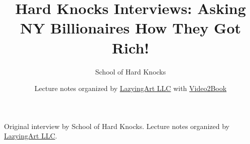 \documentclass[11pt,oneside]{book}
\begin{document}
\frontmatter
\title{Hard Knocks Interviews: Asking NY Billionaires How They Got Rich!}
\author{School of Hard Knocks}
\date{Lecture notes organized by \href{https://lazying.art}{LazyingArt LLC} with \href{https://github.com/lachlanchen/Video2Book}{Video2Book}}
\maketitle
\begin{center}
\small Original interview by School of Hard Knocks. Lecture notes organized by \href{https://lazying.art}{LazyingArt LLC}.
\end{center}
\clearpage
\mainmatter

\end{document}
